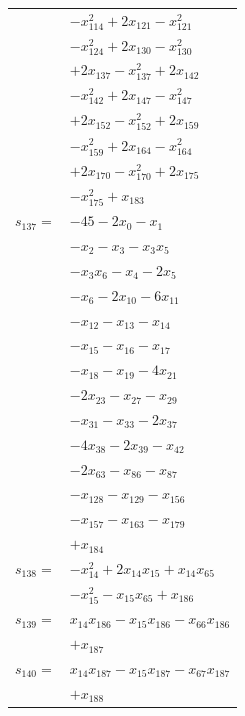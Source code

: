\begin{longtable}{@{}r@{\;}l@{}}
 & \(\displaystyle -x_{114}^{2} +2x_{121} -x_{121}^{2}\) \\
 & \(\displaystyle -x_{124}^{2} +2x_{130} -x_{130}^{2}\) \\
 & \(\displaystyle +2x_{137} -x_{137}^{2} +2x_{142}\) \\
 & \(\displaystyle -x_{142}^{2} +2x_{147} -x_{147}^{2}\) \\
 & \(\displaystyle +2x_{152} -x_{152}^{2} +2x_{159}\) \\
 & \(\displaystyle -x_{159}^{2} +2x_{164} -x_{164}^{2}\) \\
 & \(\displaystyle +2x_{170} -x_{170}^{2} +2x_{175}\) \\
 & \(\displaystyle -x_{175}^{2} +x_{183}\) \\[3pt]
\(s_{137}=\) & \(\displaystyle -45 -2x_{0} -x_{1}\) \\
 & \(\displaystyle -x_{2} -x_{3} -x_{3}x_{5}\) \\
 & \(\displaystyle -x_{3}x_{6} -x_{4} -2x_{5}\) \\
 & \(\displaystyle -x_{6} -2x_{10} -6x_{11}\) \\
 & \(\displaystyle -x_{12} -x_{13} -x_{14}\) \\
 & \(\displaystyle -x_{15} -x_{16} -x_{17}\) \\
 & \(\displaystyle -x_{18} -x_{19} -4x_{21}\) \\
 & \(\displaystyle -2x_{23} -x_{27} -x_{29}\) \\
 & \(\displaystyle -x_{31} -x_{33} -2x_{37}\) \\
 & \(\displaystyle -4x_{38} -2x_{39} -x_{42}\) \\
 & \(\displaystyle -2x_{63} -x_{86} -x_{87}\) \\
 & \(\displaystyle -x_{128} -x_{129} -x_{156}\) \\
 & \(\displaystyle -x_{157} -x_{163} -x_{179}\) \\
 & \(\displaystyle +x_{184}\) \\[3pt]
\(s_{138}=\) & \(\displaystyle -x_{14}^{2} +2x_{14}x_{15} +x_{14}x_{65}\) \\
 & \(\displaystyle -x_{15}^{2} -x_{15}x_{65} +x_{186}\) \\[3pt]
\(s_{139}=\) & \(\displaystyle x_{14}x_{186} -x_{15}x_{186} -x_{66}x_{186}\) \\
 & \(\displaystyle +x_{187}\) \\[3pt]
\(s_{140}=\) & \(\displaystyle x_{14}x_{187} -x_{15}x_{187} -x_{67}x_{187}\) \\
 & \(\displaystyle +x_{188}\) \\[3pt]

\end{longtable}
